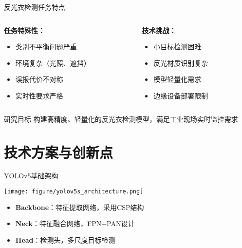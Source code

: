 \documentclass[aspectratio=169]{beamer}
\begin{document}
\begin{frame}{反光衣检测任务特点}
    \begin{columns}
        \begin{column}{0.5\textwidth}
            \textbf{任务特殊性：}
            \begin{itemize}
                \item 类别不平衡问题严重
                \item 环境复杂（光照、遮挡）
                \item 误报代价不对称
                \item 实时性要求严格
            \end{itemize}
        \end{column}
        \begin{column}{0.5\textwidth}
            \textbf{技术挑战：}
            \begin{itemize}
                \item 小目标检测困难
                \item 反光材质识别复杂
                \item 模型轻量化需求
                \item 边缘设备部署限制
            \end{itemize}
        \end{column}
    \end{columns}
    
    \vspace{0.5cm}
    \begin{block}{研究目标}
        构建高精度、轻量化的反光衣检测模型，满足工业现场实时监控需求
    \end{block}
\end{frame}

\section{技术方案与创新点}

\begin{frame}{YOLOv5基础架构}
    \begin{center}
        \texttt{[image: figure/yolov5s\_architecture.png]}
    \end{center}
    
    \begin{itemize}
        \item \textbf{Backbone}：特征提取网络，采用CSP结构
        \item \textbf{Neck}：特征融合网络，FPN+PAN设计
        \item \textbf{Head}：检测头，多尺度目标检测
    \end{itemize}
\end{frame}
\end{document}
